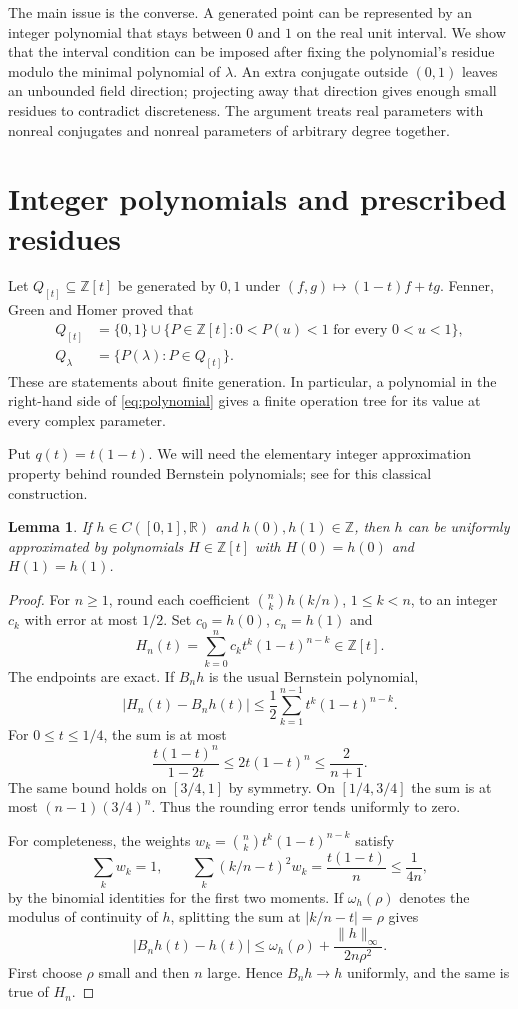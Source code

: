 \documentclass[11pt]{article}
\newtheorem{lemma}[theorem]{Lemma}
\newcommand{\R}{\mathbb R}
\newcommand{\Z}{\mathbb Z}
\begin{document}
The main issue is the converse. A generated point can be represented by
an integer polynomial that stays between $0$ and $1$ on the real unit
interval. We show that the interval condition can be imposed after fixing
the polynomial's residue modulo the minimal polynomial of $\lambda$.
An extra conjugate outside $(0,1)$ leaves an unbounded field direction;
projecting away that direction gives enough small residues to contradict
discreteness. The argument treats real parameters with nonreal conjugates
and nonreal parameters of arbitrary degree together.

\section{Integer polynomials and prescribed residues}

Let $Q_{[t]}\subseteq\Z[t]$ be generated by $0,1$ under
$(f,g)\mapsto(1-t)f+tg$. Fenner, Green and Homer proved
\cite[Theorem 3.6 and Corollary 3.8]{fgh-journal} that
\begin{align}
Q_{[t]}&=\{0,1\}\cup
 \{P\in\Z[t]:0<P(u)<1\text{ for every }0<u<1\},\label{eq:polynomial}\\
Q_\lambda&=\{P(\lambda):P\in Q_{[t]}\}.\label{eq:evaluation}
\end{align}
These are statements about finite generation. In particular, a polynomial
in the right-hand side of \eqref{eq:polynomial} gives a finite operation
tree for its value at every complex parameter.

Put $q(t)=t(1-t)$. We will need the elementary integer approximation
property behind rounded Bernstein polynomials; see
\cite[Section 1]{draganov} for this classical construction.

\begin{lemma}\label{lem:approximation}
If $h\in C([0,1],\R)$ and $h(0),h(1)\in\Z$, then $h$ can be
uniformly approximated by polynomials $H\in\Z[t]$ with
$H(0)=h(0)$ and $H(1)=h(1)$.
\end{lemma}
\begin{proof}
For $n\ge1$, round each coefficient
$\binom nk h(k/n)$, $1\le k<n$, to an integer $c_k$ with error at
most $1/2$. Set $c_0=h(0)$, $c_n=h(1)$ and
\[
 H_n(t)=\sum_{k=0}^n c_k t^k(1-t)^{n-k}\in\Z[t].
\]
The endpoints are exact. If $B_nh$ is the usual Bernstein polynomial,
\[
 |H_n(t)-B_nh(t)|\le\frac12
   \sum_{k=1}^{n-1}t^k(1-t)^{n-k}.
\]
For $0\le t\le1/4$, the sum is at most
\[
 \frac{t(1-t)^n}{1-2t}\le2t(1-t)^n\le\frac2{n+1}.
\]
The same bound holds on $[3/4,1]$ by symmetry. On $[1/4,3/4]$
the sum is at most $(n-1)(3/4)^n$. Thus the rounding error tends
uniformly to zero.

For completeness, the weights $w_k=\binom nk t^k(1-t)^{n-k}$ satisfy
\[
 \sum_k w_k=1,\qquad
 \sum_k(k/n-t)^2w_k=\frac{t(1-t)}n\le\frac1{4n},
\]
by the binomial identities for the first two moments. If
$\omega_h(\rho)$ denotes the modulus of continuity of $h$, splitting
the sum at $|k/n-t|=\rho$ gives
\[
 |B_nh(t)-h(t)|\le\omega_h(\rho)+
                  \frac{\|h\|_\infty}{2n\rho^2}.
\]
First choose $\rho$ small and then $n$ large. Hence $B_nh\to h$
uniformly, and the same is true of $H_n$.
\end{proof}
\end{document}
